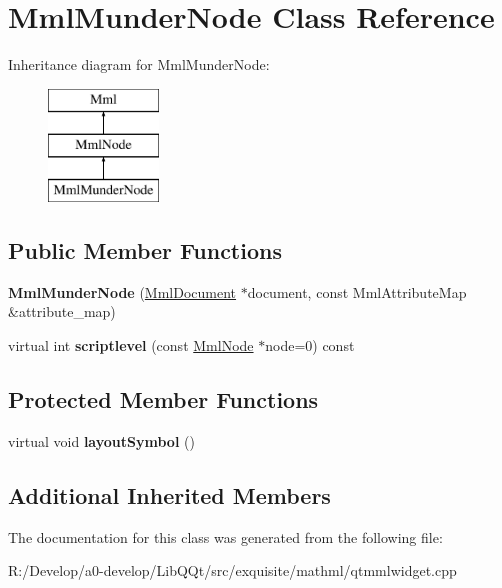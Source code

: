 \hypertarget{class_mml_munder_node}{}\section{Mml\+Munder\+Node Class Reference}
\label{class_mml_munder_node}
Inheritance diagram for Mml\+Munder\+Node\+:\begin{figure}[H]
\begin{center}
\leavevmode
\includegraphics[height=3.000000cm]{class_mml_munder_node}
\end{center}
\end{figure}
\subsection*{Public Member Functions}
\begin{DoxyCompactItemize}
\item 
\mbox{\label{class_mml_munder_node_a5b66b6c56fb51009f043a4070df5faf7}} 
{\bfseries Mml\+Munder\+Node} (\mbox{\hyperlink{class_mml_document}{Mml\+Document}} $\ast$document, const Mml\+Attribute\+Map \&attribute\+\_\+map)
\item 
\mbox{\label{class_mml_munder_node_a94d43638c6f9fb6217a2e448c6ca0fd9}} 
virtual int {\bfseries scriptlevel} (const \mbox{\hyperlink{class_mml_node}{Mml\+Node}} $\ast$node=0) const
\end{DoxyCompactItemize}
\subsection*{Protected Member Functions}
\begin{DoxyCompactItemize}
\item 
\mbox{\label{class_mml_munder_node_aed18b9d4897b70eee769d392822495a0}} 
virtual void {\bfseries layout\+Symbol} ()
\end{DoxyCompactItemize}
\subsection*{Additional Inherited Members}


The documentation for this class was generated from the following file\+:\begin{DoxyCompactItemize}
\item 
R\+:/\+Develop/a0-\/develop/\+Lib\+Q\+Qt/src/exquisite/mathml/qtmmlwidget.\+cpp\end{DoxyCompactItemize}
